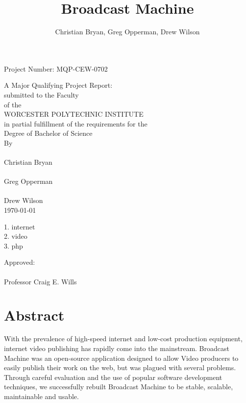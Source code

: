 \documentclass[a4paper,12pt]{report}
\title{Broadcast Machine}
\author{Christian Bryan, Greg Opperman, Drew Wilson}
\begin{document}
\begin{titlepage}
  \topmargin 0.5in
  \headheight 0in
\begin{center}
  \begin{flushright}
Project Number: MQP-CEW-0702\\
\end{flushright}
\vspace*{40mm}
A Major Qualifying Project Report:\\
submitted to the Faculty\\
of the\\
WORCESTER POLYTECHNIC INSTITUTE\\
in partial fulfillment of the requirements for the\\
Degree of Bachelor of Science\\
By\\
\makebox[2in]{\hrulefill}\\
Christian Bryan\\
\vspace*{10mm}
\makebox[2in]{\hrulefill}\\
Greg Opperman\\
\vspace*{10mm}
\makebox[2in]{\hrulefill}\\
Drew Wilson\\
\vspace*{10mm}
\today\\
\vspace*{10mm}
\begin{flushleft}
  1. internet\\
  2. video\\
  3. php\\
\end{flushleft}
\begin{flushright}
Approved:\\
\vspace*{10mm}
\makebox[2in]{\hrulefill}\\
Professor Craig E. Wills\\
\end{flushright}
\end{center}
\end{titlepage}

\chapter*{Abstract}
With the prevalence of high-speed internet and low-cost production equipment, internet video publishing has rapidly come into the mainstream.
Broadcast Machine was an open-source application designed to allow Video producers to easily publish their work on the web, but was plagued with several problems.
Through careful evaluation and the use of popular software development techniques, we successfully rebuilt Broadcast Machine to be stable, scalable, maintainable and usable.
\end{document}
